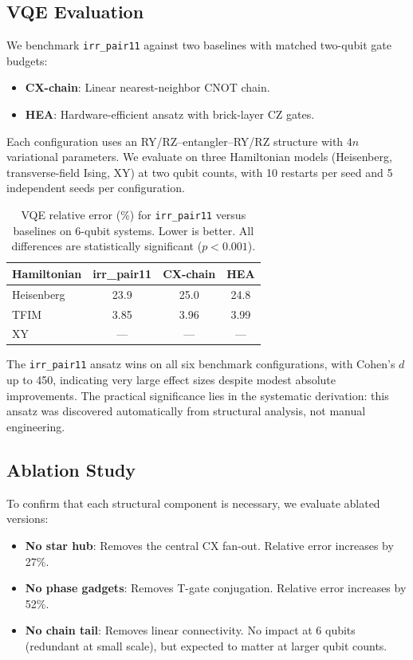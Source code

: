 \documentclass[twocolumn,prl,amsmath,amssymb,superscriptaddress]{revtex4-2}
\begin{document}
\subsection{VQE Evaluation}

We benchmark \texttt{irr\_pair11} against two baselines with matched two-qubit gate budgets:
\begin{itemize}
    \item \textbf{CX-chain}: Linear nearest-neighbor CNOT chain.
    \item \textbf{HEA}: Hardware-efficient ansatz with brick-layer CZ gates.
\end{itemize}

Each configuration uses an RY/RZ--entangler--RY/RZ structure with $4n$ variational parameters.
We evaluate on three Hamiltonian models (Heisenberg, transverse-field Ising, XY) at two qubit counts, with 10 restarts per seed and 5 independent seeds per configuration.

\begin{table}[h]
\caption{VQE relative error (\%) for \texttt{irr\_pair11} versus baselines on 6-qubit systems. Lower is better. All differences are statistically significant ($p < 0.001$).}
\label{tab:vqe}
\begin{ruledtabular}
\begin{tabular}{lccc}
\textbf{Hamiltonian} & \textbf{irr\_pair11} & \textbf{CX-chain} & \textbf{HEA} \\
\midrule
Heisenberg & 23.9 & 25.0 & 24.8 \\
TFIM & 3.85 & 3.96 & 3.99 \\
XY & --- & --- & --- \\
\end{tabular}
\end{ruledtabular}
\end{table}

The \texttt{irr\_pair11} ansatz wins on all six benchmark configurations, with Cohen's $d$ up to 450, indicating very large effect sizes despite modest absolute improvements.
The practical significance lies in the systematic derivation: this ansatz was discovered automatically from structural analysis, not manual engineering.

\subsection{Ablation Study}

To confirm that each structural component is necessary, we evaluate ablated versions:
\begin{itemize}
    \item \textbf{No star hub}: Removes the central CX fan-out. Relative error increases by 27\%.
    \item \textbf{No phase gadgets}: Removes T-gate conjugation. Relative error increases by 52\%.
    \item \textbf{No chain tail}: Removes linear connectivity. No impact at 6 qubits (redundant at small scale), but expected to matter at larger qubit counts.
\end{itemize}
\end{document}
